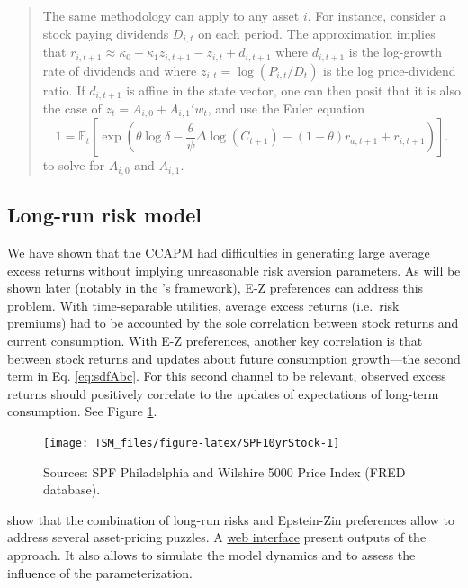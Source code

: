 \documentclass[
  12pt,
]{book}
\theoremstyle{definition}
\theoremstyle{definition}
\theoremstyle{definition}
\theoremstyle{definition}
\theoremstyle{remark}
\begin{document}
\begin{quote}
The same methodology can apply to any asset \(i\). For instance, consider a stock paying dividends \(D_{i,t}\) on each period. The \citet{Campbell_Shiller_1988} approximation implies that \(r_{i,t+1} \approx \kappa_0 + \kappa_1 z_{i,t+1} - z_{i,t} + d_{i,t+1}\) where \(d_{i,t+1}\) is the log-growth rate of dividends and where \(z_{i,t} = \log(P_{i,t}/D_t)\) is the log price-dividend ratio. If \(d_{i,t+1}\) is affine in the state vector, one can then posit that it is also the case of \(z_t= A_{i,0}+A_{i,1}'w_t\), and use the Euler equation
\begin{equation}
1 = \mathbb{E}_t \left[ \exp\left(\theta \log \delta - \frac{\theta}{\psi} \Delta \log(C_{t+1}) - (1 - \theta) r_{a,t+1} + r_{i,t+1} \right) \right].\label{eq:sdfRi}
\end{equation}
to solve for \(A_{i,0}\) and \(A_{i,1}\).
\end{quote}

\hypertarget{long-run-risk-model}{%
\subsection{Long-run risk model}\label{long-run-risk-model}}

We have shown that the CCAPM had difficulties in generating large average excess returns without implying unreasonable risk aversion parameters.
As will be shown later (notably in the \citet{Bansal_Yaron_2004}'s framework), E-Z preferences can address this problem.
With time-separable utilities, average excess returns (i.e.~risk premiums) had to be accounted by the sole correlation between stock returns and current consumption.
With E-Z preferences, another key correlation is that between stock returns and updates about future consumption growth---the second term in Eq. \eqref{eq:sdfAbc}.
For this second channel to be relevant, observed excess returns should positively correlate to the updates of expectations of long-term consumption. See Figure \ref{fig:SPF10yrStock}.

\begin{figure}
\texttt{[image: TSM\_files/figure-latex/SPF10yrStock-1]} \caption{Sources: SPF Philadelphia and Wilshire 5000 Price Index (FRED database).}\label{fig:SPF10yrStock}
\end{figure}

\citet{Bansal_Yaron_2004} show that the combination of long-run risks and Epstein-Zin preferences allow to address several asset-pricing puzzles. A \href{https://jrenne.shinyapps.io/LRRModels}{web interface} present outputs of the approach. It also allows to simulate the model dynamics and to assess the influence of the parameterization.
\end{document}
